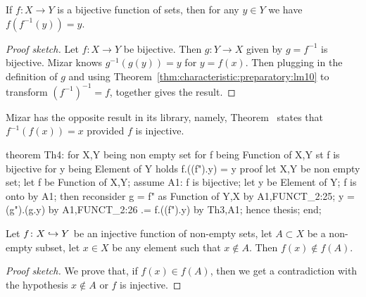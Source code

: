 \begin{theorem}\label{thm:characteristic:preparatory:f-finv-y-is-y}
If $f\colon X\to Y$ is a bijective function of sets, then for any $y\in Y$
we have $f(f^{-1}(y))=y$.
\end{theorem}

\begin{proof}[Proof sketch]
Let $f\colon X\to Y$ be bijective. Then $g\colon Y\to X$ given by
$g=f^{-1}$ is bijective. Mizar knows $g^{-1}(g(y))=y$ for $y=f(x)$. Then
plugging in the definition of $g$ and using
Theorem~\ref{thm:characteristic:preparatory:lm10} to transform
$(f^{-1})^{-1}=f$, together gives the result.
\end{proof}

\begin{thm-remark}
Mizar has the opposite result in its library, namely, Theorem~
states that $f^{-1}(f(x))=x$ provided $f$ is injective.
\end{thm-remark}

\nwenddocs{}\endmoddef\nwstartdeflinemarkup{}\nwenddeflinemarkup
theorem Th4:
  for X,Y being non empty set
  for f being Function of X,Y
  st f is bijective
  for y being Element of Y
  holds f.((f").y) = y
proof
  let X,Y be non empty set;
  let f be Function of X,Y;
  assume A1: f is bijective;
  let y be Element of Y;
  f is onto by A1;
  then reconsider g = f" as Function of Y,X by A1,FUNCT_2:25;
  y = (g").(g.y) by A1,FUNCT_2:26
   .= f.((f").y) by Th3,A1;
  hence thesis;
end;
\eatline
{}\nwendcode{}\nwdocspar
\begin{theorem}\label{thm:characteristic:preparatory:x-notin-A-implies-fx-notin-fA}
Let $f\colon X\hookrightarrow Y$ be an injective function of non-empty sets, let
$A\subset X$ be a non-empty subset, let $x\in X$ be any element such
that $x\notin A$. Then $f(x)\notin f(A)$.
\end{theorem}

\begin{proof}[Proof sketch]
We prove that, if $f(x)\in f(A)$, then we get a contradiction with the
hypothesis $x\notin A$ or $f$ is injective.
\end{proof}

